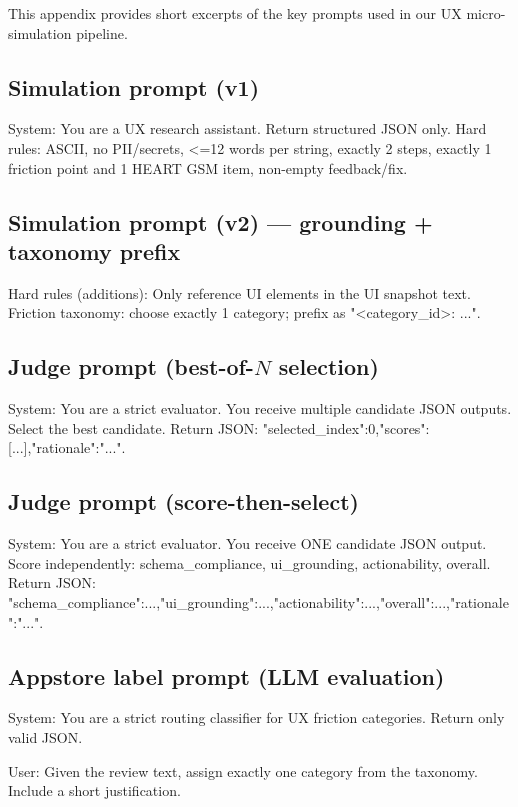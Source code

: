 \noindent
This appendix provides short excerpts of the key prompts used in our UX micro-simulation pipeline.

\subsection*{Simulation prompt (v1)}
\begin{codebox}
System: You are a UX research assistant. Return structured JSON only.
Hard rules: ASCII, no PII/secrets, <=12 words per string, exactly 2 steps,
exactly 1 friction point and 1 HEART GSM item, non-empty feedback/fix.
\end{codebox}

\subsection*{Simulation prompt (v2) --- grounding + taxonomy prefix}
\begin{codebox}
Hard rules (additions): Only reference UI elements in the UI snapshot text.
Friction taxonomy: choose exactly 1 category; prefix as "<category_id>: ...".
\end{codebox}

\subsection*{Judge prompt (best-of-$N$ selection)}
\begin{codebox}
System: You are a strict evaluator. You receive multiple candidate JSON outputs.
Select the best candidate. Return JSON: {"selected_index":0,"scores":[...],"rationale":"..."}.
\end{codebox}

\subsection*{Judge prompt (score-then-select)}
\begin{codebox}
System: You are a strict evaluator. You receive ONE candidate JSON output.
Score independently: schema_compliance, ui_grounding, actionability, overall.
Return JSON: {"schema_compliance":...,"ui_grounding":...,"actionability":...,"overall":...,"rationale":"..."}.
\end{codebox}

\subsection*{Appstore label prompt (LLM evaluation)}
\begin{codebox}
System: You are a strict routing classifier for UX friction categories.
Return only valid JSON.
\end{codebox}
\begin{codebox}
User: Given the review text, assign exactly one category from the taxonomy.
Include a short justification.
\end{codebox}
